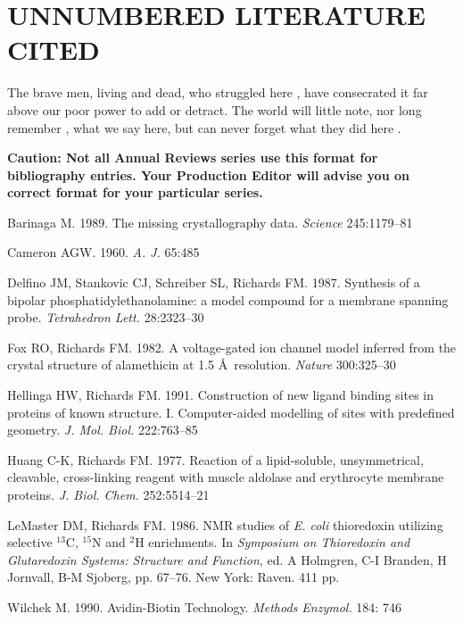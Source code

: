 \documentclass{ar2e}
\begin{document}
\section{UNNUMBERED LITERATURE CITED}

The brave men, living and dead, who struggled
here \citet{Hellinga91}, have consecrated it far above our poor power to add or detract. The
world will little note, nor long remember \citet{Huang77}, what we say here, but can never
forget what they did here \citet{Barinaga89,Cameron60,Delfino87}.


{\bf Caution: Not all Annual Reviews series use this format for
bibliography entries. Your Production Editor will advise you on correct format for
your particular series.}\newline


\begin{thebibliography}{}
Barinaga M. 1989. The missing crystallography data. {\it Science} 
245:1179--81

Cameron AGW. 1960. {\it A. J.} 65:485

Delfino JM, Stankovic CJ, Schreiber SL, Richards FM. 1987. 
Synthesis of a bipolar phosphatidylethanolamine: a model 
compound for a membrane spanning probe. {\it Tetrahedron Lett.}
28:2323--30

Fox RO, Richards FM. 1982. A voltage-gated ion channel model 
inferred from the crystal structure of alamethicin at 1.5 \AA\  
resolution. {\it Nature} 300:325--30

Hellinga HW, Richards FM. 1991. Construction of new ligand 
binding sites in proteins of known structure. I. 
Computer-aided modelling of sites with predefined geometry. {\it J. Mol. 
Biol.} 222:763--85

Huang C-K, Richards FM. 1977. Reaction of a lipid-soluble, 
unsymmetrical, cleavable, cross-linking reagent with muscle 
aldolase and erythrocyte membrane proteins. {\it J. Biol. Chem.} 252:5514--21

LeMaster DM, Richards FM. 1986. NMR studies of {\it E. coli} 
thioredoxin utilizing selective $^{13}$C, $^{15}$N and $^{2}$H enrichments. In 
{\it Symposium on Thioredoxin and Glutaredoxin Systems: Structure 
and Function}, ed. A Holmgren, C-I Branden, H Jornvall, B-M 
Sjoberg, pp. 67--76. New York: Raven. 411 pp.

Wilchek M. 1990. Avidin-Biotin Technology. 
{\it Methods Enzymol.} 184: 746 
\end{thebibliography}
\end{document}

